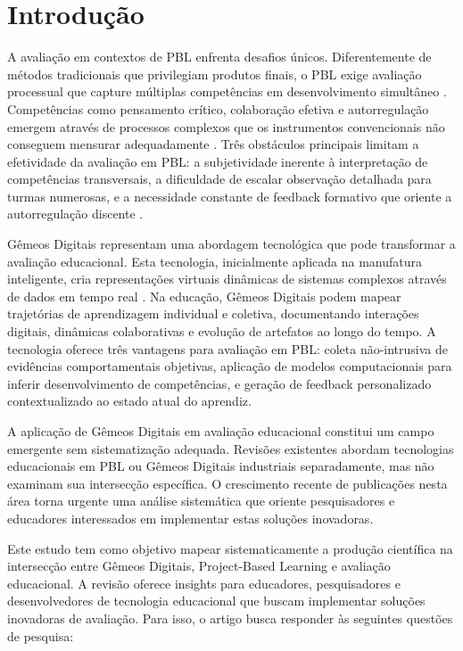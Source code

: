 \documentclass[english, spanish, brazilian]{RBIEarticle} %
\begin{document}

\section{Introdução}

A avaliação em contextos de PBL enfrenta desafios únicos. Diferentemente de métodos tradicionais que privilegiam produtos finais, o PBL exige avaliação processual que capture múltiplas competências em desenvolvimento simultâneo \parencite{Helle2006}. Competências como pensamento crítico, colaboração efetiva e autorregulação emergem através de processos complexos que os instrumentos convencionais não conseguem mensurar adequadamente \parencite{Frank2003}. Três obstáculos principais limitam a efetividade da avaliação em PBL: a subjetividade inerente à interpretação de competências transversais, a dificuldade de escalar observação detalhada para turmas numerosas, e a necessidade constante de feedback formativo que oriente a autorregulação discente \parencite{Savery2015}.

Gêmeos Digitais representam uma abordagem tecnológica que pode transformar a avaliação educacional. Esta tecnologia, inicialmente aplicada na manufatura inteligente, cria representações virtuais dinâmicas de sistemas complexos através de dados em tempo real \parencite{Grieves2014}. Na educação, Gêmeos Digitais podem mapear trajetórias de aprendizagem individual e coletiva, documentando interações digitais, dinâmicas colaborativas e evolução de artefatos ao longo do tempo. A tecnologia oferece três vantagens para avaliação em PBL: coleta não-intrusiva de evidências comportamentais objetivas, aplicação de modelos computacionais para inferir desenvolvimento de competências, e geração de feedback personalizado contextualizado ao estado atual do aprendiz.

A aplicação de Gêmeos Digitais em avaliação educacional constitui um campo emergente sem sistematização adequada. Revisões existentes abordam tecnologias educacionais em PBL ou Gêmeos Digitais industriais separadamente, mas não examinam sua intersecção específica. O crescimento recente de publicações nesta área torna urgente uma análise sistemática que oriente pesquisadores e educadores interessados em implementar estas soluções inovadoras.

Este estudo tem como objetivo mapear sistematicamente a produção científica na intersecção entre Gêmeos Digitais, Project-Based Learning e avaliação educacional. A revisão oferece insights para educadores, pesquisadores e desenvolvedores de tecnologia educacional que buscam implementar soluções inovadoras de avaliação. Para isso, o artigo busca responder às seguintes questões de pesquisa:
\end{document}
